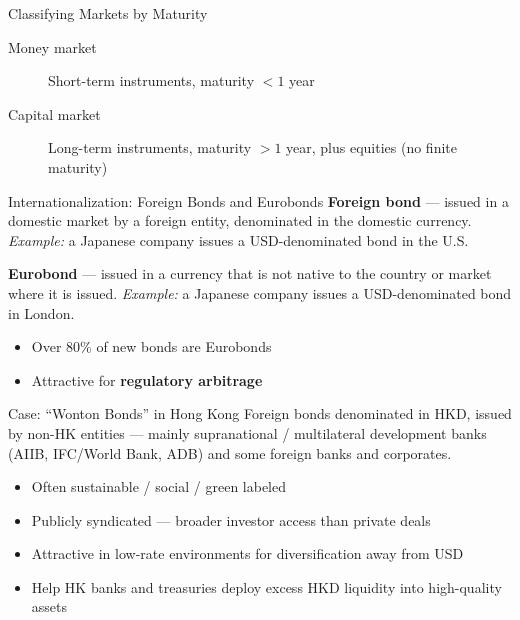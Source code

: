 \documentclass[aspectratio=169]{beamer}
\begin{document}
\begin{frame}{Classifying Markets by Maturity}
\begin{description}
  \item[Money market] Short-term instruments, maturity $< 1$ year
  \item[Capital market] Long-term instruments, maturity $> 1$ year, plus equities (no finite maturity)
\end{description}
\end{frame}


\begin{frame}{Internationalization: Foreign Bonds and Eurobonds}
\textbf{Foreign bond} --- issued in a domestic market by a foreign entity, denominated in the domestic currency.
\emph{Example:} a Japanese company issues a USD-denominated bond in the U.S.
\vspace{0.5em}

\textbf{Eurobond} --- issued in a currency that is not native to the country or market where it is issued.
\emph{Example:} a Japanese company issues a USD-denominated bond in London.
\begin{itemize}
  \item Over 80\% of new bonds are Eurobonds
  \item Attractive for \textbf{regulatory arbitrage}
\end{itemize}
\end{frame}

\begin{frame}{Case: ``Wonton Bonds'' in Hong Kong}
Foreign bonds denominated in HKD, issued by non-HK entities --- mainly supranational / multilateral development banks (AIIB, IFC/World Bank, ADB) and some foreign banks and corporates.
\vspace{0.4em}
\begin{itemize}
  \item Often sustainable / social / green labeled
  \item Publicly syndicated --- broader investor access than private deals
  \item Attractive in low-rate environments for diversification away from USD
  \item Help HK banks and treasuries deploy excess HKD liquidity into high-quality assets
\end{itemize}
\end{frame}
\end{document}

